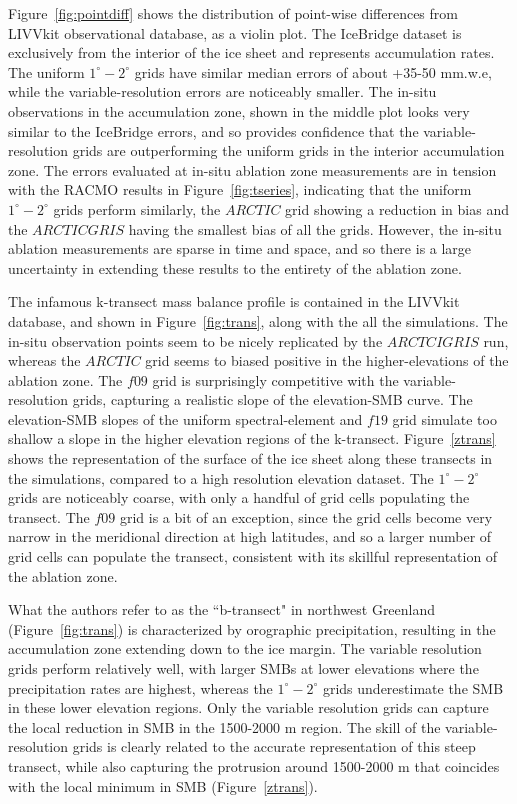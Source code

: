 \documentclass[draft]{agujournal2019}
\begin{document}
Figure~\ref{fig:pointdiff} shows the distribution of point-wise differences from LIVVkit observational database, as a violin plot. The IceBridge dataset is exclusively from the interior of the ice sheet and represents accumulation rates. The uniform $1^{\circ}-2^{\circ}$ grids have similar median errors of about +35-50 mm.w.e, while the variable-resolution errors are noticeably smaller. The in-situ observations in the accumulation zone, shown in the middle plot looks very similar to the IceBridge errors, and so provides confidence that the variable-resolution grids are outperforming the uniform grids in the interior accumulation zone. The errors evaluated at in-situ ablation zone measurements are in tension with the RACMO results in Figure~\ref{fig:tseries}, indicating that the uniform $1^{\circ}-2^{\circ}$ grids perform similarly, the $ARCTIC$ grid showing a reduction in bias and the $ARCTICGRIS$ having the smallest bias of all the grids. However, the in-situ ablation measurements are sparse in time and space, and so there is a large uncertainty in extending these results to the entirety of the ablation zone.

The infamous k-transect mass balance profile is contained in the LIVVkit database, and shown in Figure~\ref{fig:trans}, along with the all the simulations. The in-situ observation points seem to be nicely replicated by the $ARCTCIGRIS$ run, whereas the $ARCTIC$ grid seems to biased positive in the higher-elevations of the ablation zone. The $f09$ grid is surprisingly competitive with the variable-resolution grids, capturing a realistic slope of the elevation-SMB curve. The elevation-SMB slopes of the uniform spectral-element and $f19$ grid simulate too shallow a slope in the higher elevation regions of the k-transect. Figure~\ref{ztrans} shows the representation of the surface of the ice sheet along these transects in the simulations, compared to a high resolution elevation dataset. The $1^{\circ}-2^{\circ}$ grids are noticeably coarse, with only a handful of grid cells populating the transect. The $f09$ grid is a bit of an exception, since the grid cells become very narrow in the meridional direction at high latitudes, and so a larger number of grid cells can populate the transect, consistent with its skillful representation of the ablation zone.

What the authors refer to as the ``b-transect" in northwest Greenland (Figure~\ref{fig:trans}) is characterized by orographic precipitation, resulting in the accumulation zone extending down to the ice margin. The variable resolution grids perform relatively well, with larger SMBs at lower elevations where the precipitation rates are highest, whereas the $1^{\circ}-2^{\circ}$ grids underestimate the SMB in these lower elevation regions. Only the variable resolution grids can capture the local reduction in SMB in the 1500-2000 m region. The skill of the variable-resolution grids is clearly related to the accurate representation of this steep transect, while also capturing the protrusion around 1500-2000 m that coincides with the local minimum in SMB (Figure~\ref{ztrans}).
\end{document}
